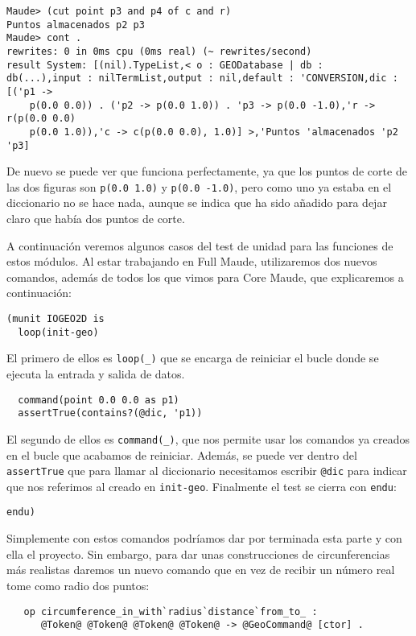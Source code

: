 {\codesize
\begin{verbatim}
Maude> (cut point p3 and p4 of c and r)
Puntos almacenados p2 p3
Maude> cont .
rewrites: 0 in 0ms cpu (0ms real) (~ rewrites/second)
result System: [(nil).TypeList,< o : GEODatabase | db : 
db(...),input : nilTermList,output : nil,default : 'CONVERSION,dic : [('p1 ->
    p(0.0 0.0)) . ('p2 -> p(0.0 1.0)) . 'p3 -> p(0.0 -1.0),'r -> r(p(0.0 0.0)
    p(0.0 1.0)),'c -> c(p(0.0 0.0), 1.0)] >,'Puntos 'almacenados 'p2 'p3]
\end{verbatim}
}

De nuevo se puede ver que funciona perfectamente, ya que los puntos de corte de las dos figuras son \verb"p(0.0 1.0)" y \verb"p(0.0 -1.0)", pero como uno ya estaba en el diccionario no se hace nada, aunque se indica que ha sido añadido para dejar claro que había dos puntos de corte.\par

A continuación veremos algunos casos del test de unidad para las funciones de estos módulos. Al estar trabajando en Full Maude, utilizaremos dos nuevos comandos, además de todos los que vimos para Core Maude, que explicaremos a continuación:
{\codesize
\begin{verbatim}
(munit IOGEO2D is
  loop(init-geo)
\end{verbatim}
}
El primero de ellos es \verb"loop(_)" que se encarga de reiniciar el bucle donde se ejecuta la entrada y salida de datos.\par
{\codesize
\begin{verbatim}
  command(point 0.0 0.0 as p1)
  assertTrue(contains?(@dic, 'p1))
\end{verbatim}
}
El segundo de ellos es \verb"command(_)", que nos permite usar los comandos ya creados en el bucle que acabamos de reiniciar. Además, se puede ver dentro del \verb"assertTrue" que para llamar al diccionario necesitamos escribir \verb"@dic" para indicar que nos referimos al creado en \verb"init-geo". Finalmente el test se cierra con \verb"endu":\par
{\codesize
\begin{verbatim}
endu)
\end{verbatim}
}

Simplemente con estos comandos podríamos dar por terminada esta parte y con ella el proyecto. Sin embargo, para dar unas construcciones de circunferencias más realistas daremos un nuevo comando que en vez de recibir un número real tome como radio  dos puntos:

{\codesize
\begin{verbatim}
   op circumference_in_with`radius`distance`from_to_ : 
      @Token@ @Token@ @Token@ @Token@ -> @GeoCommand@ [ctor] .
\end{verbatim}
}

